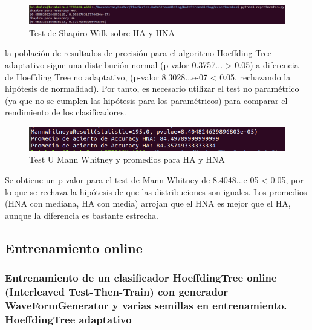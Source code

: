 \begin{figure}[H] %
	\centering
	\includegraphics[scale=0.35]{off1.png}  %
	\caption{Test de Shapiro-Wilk sobre HA y HNA} 
	\label{fig:off4}
\end{figure}
 
la población de resultados de precisión para el algoritmo Hoeffding Tree adaptativo sigue una distribución normal (p-valor 0.3757... > 0.05) a diferencia de Hoeffding Tree no adaptativo, (p-valor 8.3028...e-07 < 0.05, rechazando la hipótesis de normalidad). Por tanto, es necesario utilizar el test no paramétrico (ya que no se cumplen las hipótesis para los paramétricos) para comparar el rendimiento de los clasificadores. 

\begin{figure}[H] %
	\centering
	\includegraphics[scale=0.5]{off2.png}  %
	\caption{Test U Mann Whitney y promedios para HA y HNA} 
	\label{fig:off5}
\end{figure}

Se obtiene un p-valor para el test de Mann-Whitney de 8.4048...e-05 < 0.05, por lo que se rechaza la hipótesis de que las distribuciones son iguales. Los promedios (HNA con mediana, HA con media) arrojan que el HNA es mejor que el HA, aunque la diferencia es bastante estrecha. 

\subsection{Entrenamiento online}

\subsubsection{Entrenamiento de un clasificador HoeffdingTree online (Interleaved Test-Then-Train) con generador WaveFormGenerator y varias semillas en entrenamiento. HoeffdingTree adaptativo}

